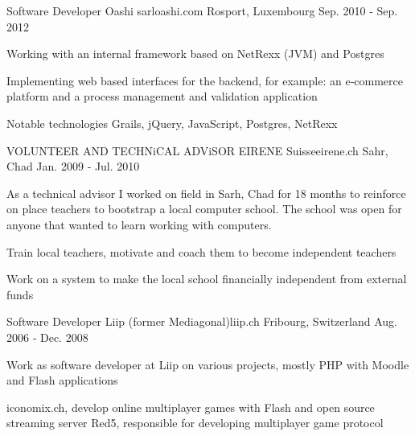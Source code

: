 \begin{cventries}
  \cventry
    {Software Developer} %
    {Oashi sarl{\enskip\cdotp\enskip}oashi.com} %
    {Rosport, Luxembourg} %
    {Sep. 2010 ‑ Sep. 2012} %
    {
      \begin{cvitems} %
        \item {Working with an internal framework based on NetRexx (JVM) and Postgres}
        \item {Implementing web based interfaces for the backend, for example: an e‑commerce platform and a process management and validation application}
        \item {Notable technologies Grails, jQuery, JavaScript, Postgres, NetRexx}
      \end{cvitems}
    }

  \cventry
    {VOLUNTEER AND TECHNiCAL ADViSOR} %
    {EIRENE Suisse{\enskip\cdotp\enskip}eirene.ch} %
    {Sahr, Chad} %
    {Jan. 2009 ‑ Jul. 2010} %
    {
      \begin{cvitems} %
        \item {As a technical advisor I worked on field in Sarh, Chad for 18 months to reinforce on place teachers to bootstrap a local computer school. The school was open for anyone that wanted to learn working with computers.}
        \item {Train local teachers, motivate and coach them to become independent teachers}
        \item {Work on a system to make the local school financially independent from external funds}
      \end{cvitems}
    }

  \cventry
    {Software Developer} %
    {Liip (former Mediagonal){\enskip\cdotp\enskip}liip.ch} %
    {Fribourg, Switzerland} %
    {Aug. 2006 ‑ Dec. 2008} %
    {
      \begin{cvitems} %
        \item {Work as software developer at Liip on various projects, mostly PHP with Moodle and Flash applications}
        \item {iconomix.ch, develop online multiplayer games with Flash and open source streaming server Red5, responsible for developing multiplayer game protocol}
      \end{cvitems}
    }


\end{cventries}
